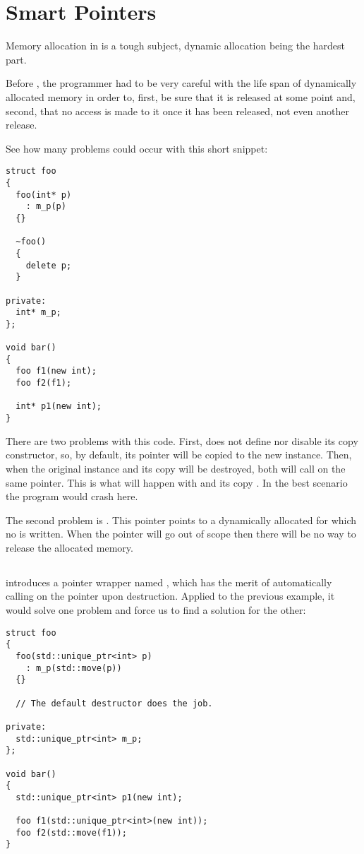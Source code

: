 \section{Smart Pointers}

Memory allocation in \cpp{} is a tough subject, dynamic allocation
being the hardest part.

Before , the programmer had to be very careful with the life
span of dynamically allocated memory in order to, first, be sure that
it is released at some point and, second, that no access is made to it
once it has been released, not even another release.

See how many problems could occur with this short snippet:

\begin{lstlisting}
struct foo
{
  foo(int* p)
    : m_p(p)
  {}

  ~foo()
  {
    delete p;
  }

private:
  int* m_p;
};

void bar()
{
  foo f1(new int);
  foo f2(f1);

  int* p1(new int);
}
\end{lstlisting}

There are two problems with this code. First,  does not
define nor disable its copy constructor, so, by default, its
 pointer will be copied to the new instance. Then, when the
original instance and its copy will be destroyed, both will call
 on the same pointer. This is what will happen with
 and its copy . In the best scenario the program
would crash here.

The second problem is . This pointer points to a dynamically
allocated  for which no  is written. When the
pointer will go out of scope then there will be no way to release the
allocated memory.

\subsection{}

 introduces a pointer wrapper named ,
which has the merit of automatically calling  on the
pointer upon destruction. Applied to the previous example, it would
solve one problem and force us to find a solution for the other:

\begin{lstlisting}
struct foo
{
  foo(std::unique_ptr<int> p)
    : m_p(std::move(p))
  {}

  // The default destructor does the job.

private:
  std::unique_ptr<int> m_p;
};

void bar()
{
  std::unique_ptr<int> p1(new int);

  foo f1(std::unique_ptr<int>(new int));
  foo f2(std::move(f1));
}
\end{lstlisting}

